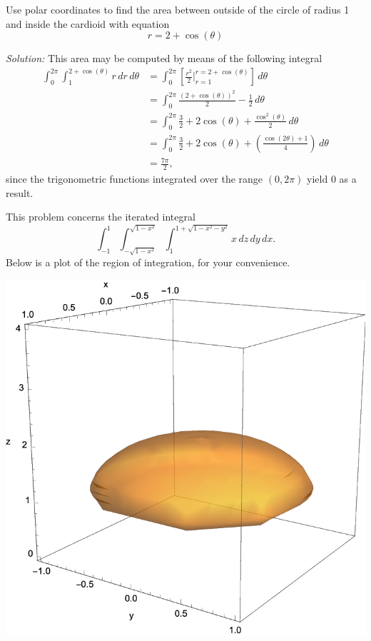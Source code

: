 \documentclass[11pt]{exam}
\begin{document}
\begin{questions}
\newpage

\addpoints
\question[10] Use polar coordinates to find the area between outside of the circle of radius 1 and inside the cardioid with equation 
\begin{equation*}
r = 2+ \cos(\theta)
\end{equation*}

\textit{Solution:} This area may be computed by means of the following integral
\begin{align*}
\int_{0}^{2\pi} \int_{1}^{2+\cos(\theta)} r \, dr \, d\theta & = \int_{0}^{2\pi} \left[ \frac{r^2}{2} \Big|_{r=1}^{r=2+\cos(\theta)} \right] \, d\theta \\
& = \int_{0}^{2\pi} \frac{(2+\cos(\theta))^2}{2} - \frac{1}{2} \, d\theta \\
& = \int_{0}^{2\pi} \frac{3}{2}+2\cos(\theta)+\frac{\cos^2(\theta)}{2} \, d\theta \\
& = \int_{0}^{2\pi} \frac{3}{2}+2\cos(\theta)+ \left(\frac{\cos(2\theta)+1}{4}\right) \, d\theta \\
& = \frac{7\pi}{2},
\end{align*}
since the trigonometric functions integrated over the range $(0,2\pi)$ yield $0$ as a result. 
\newpage

\addpoints
\question This problem concerns the iterated integral
\begin{equation*}
\int_{-1}^{1} \int_{-\sqrt{1-x^2}}^{\sqrt{1-x^2}} \int_{1}^{1+\sqrt{1-x^2-y^2}} x \, dz \, dy \, dx.
\end{equation*}
Below is a plot of the region of integration, for your convenience.
\begin{center}
\includegraphics[scale=0.5]{p1.pdf}
\end{center}
\begin{parts}

\end{parts}
\end{questions}
\end{document}
